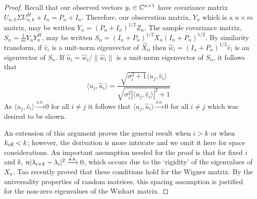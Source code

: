 \begin{proof}
Recall that our observed vectors $y_i\in\mathbb{C}^{n\times 1}$ have covariance matrix $U_{n,k}\Sigma U_{n,k}^H+I_n=P_n+I_n$. Therefore, our observation matrix, $Y_n$ which is a $n\times m$ matrix, may be written $Y_n=\left(P_n+I_n\right)^{1/2}Z_n$. The sample covariance matrix, $S_n=\frac{1}{m}Y_nY_n^H$, may be written $S_n=\left(I_n+P_n\right)^{1/2}X_n\left(I_n+P_n\right)^{1/2}$. By similarity transform, if $\widehat{v}_i$ is a unit-norm eigenvector of $\widehat{X}_n$ then $\widehat{w}_i=\left(I_n+P_n\right)^{1/2}\widehat{v}_i$ is an eigenvector of $S_n$. If $\widehat{u}_i=\widehat{w}_i/\|\widehat{w}_i\|$ is a unit-norm eigenvector of $S_n$, it follows that
\begin{equation*}
\langle u_j,\widehat{u}_i\rangle=\frac{\sqrt{\sigma_i^2+1}\langle u_j,\widehat{v}_i\rangle}{\sqrt{\sigma_i^2|\langle u_j,\widehat{v}_i\rangle|^2+1}}
\end{equation*}
As $\langle u_j,\widehat{v}_i\rangle\overset{\text{a.s.}}{\longrightarrow}0$ for all $i\neq j$ it follows that $\langle u_j,\widehat{u}_i\rangle\overset{\text{a.s.}}{\longrightarrow}0$ for all $i\neq j$ which was desired to be shown.

An extension of this argument proves the general result when $i>k$ or when $k_\text{eff} <k$; however, the derivation is more intricate and we omit it here for space considerations. An important assumption needed for the proof is that for fixed $i$ and $k$, $n |\lambda_{i+k} - \lambda_{i}|^{2} \overset{\textrm{a.s.}}{\longrightarrow} 0$, which occurs due to  the `rigidity' of the eigenvalues of $X_n$. Tao  \cite{tao2012asymptotic} recently proved that these conditions hold for the Wigner matrix. By the universality \cite{erdHos2011universality} properties of random matrices, this spacing assumption is justified for the non-zero eigenvalues of the Wishart matrix.

\end{proof}










